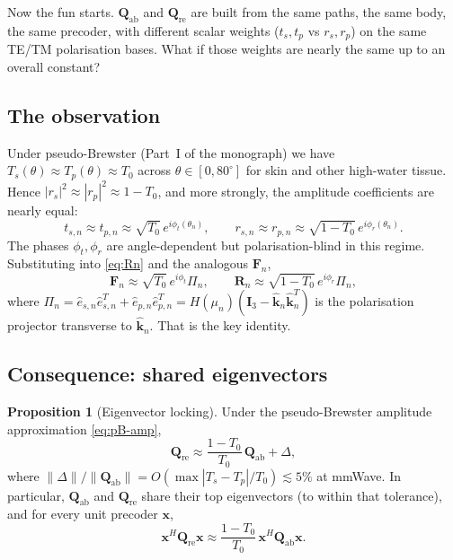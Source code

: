 \documentclass[11pt,a4paper]{article}
\theoremstyle{definition}
\newtheorem{proposition}[proposition]{Proposition}
\newcommand{\khat}{\hat{\bm{k}}}
\newcommand{\Fn}{\mathbf{F}_{\!n}}
\newcommand{\Rn}{\mathbf{R}_{\!n}}
\newcommand{\Qabs}{\mathbf{Q}_{\mathrm{ab}}}
\newcommand{\Qref}{\mathbf{Q}_{\mathrm{re}}}
\begin{document}
Now the fun starts.  $\Qabs$ and $\Qref$ are built from the same
paths, the same body, the same precoder, with different scalar
weights ($t_s,t_p$ vs $r_s,r_p$) on the same TE/TM polarisation
bases.  What if those weights are nearly the same up to an overall
constant?

\subsection{The observation}

Under pseudo-Brewster (Part~I of the monograph) we have
$T_s(\theta)\approx T_p(\theta)\approx T_0$ across
$\theta\in[0,80^\circ]$ for skin and other high-water tissue.  Hence
$|r_s|^2\approx|r_p|^2\approx 1-T_0$, and more strongly, the
amplitude coefficients are nearly equal:
\begin{equation}\label{eq:pB-amp}
  t_{s,n}\approx t_{p,n}\approx\sqrt{T_0}\,e^{i\phi_t(\theta_n)},
  \qquad
  r_{s,n}\approx r_{p,n}\approx\sqrt{1-T_0}\,e^{i\phi_r(\theta_n)}.
\end{equation}
The phases $\phi_t,\phi_r$ are angle-dependent but
polarisation-blind in this regime.  Substituting into \cref{eq:Rn}
and the analogous $\Fn$,
\begin{equation}\label{eq:F-R-collapse}
  \Fn\approx \sqrt{T_0}\,e^{i\phi_t}\Pi_n,\qquad
  \Rn\approx \sqrt{1-T_0}\,e^{i\phi_r}\Pi_n,
\end{equation}
where $\Pi_n=\hat e_{s,n}\hat e_{s,n}^{\!T}+\hat e_{p,n}\hat e_{p,n}^{\!T}
=H(\mu_n)(\mathbf{I}_3-\khat_n\khat_n^{\!T})$ is the polarisation
projector transverse to $\khat_n$.  That is the key identity.

\subsection{Consequence: shared eigenvectors}

\begin{proposition}[Eigenvector locking]\label{prop:lock}
Under the pseudo-Brewster amplitude approximation \cref{eq:pB-amp},
\begin{equation}\label{eq:lock}
  \Qref\approx\frac{1-T_0}{T_0}\,\Qabs + \Delta,
\end{equation}
where $\|\Delta\|/\|\Qabs\|=O(\max|T_s-T_p|/T_0)\lesssim 5\%$ at mmWave.
In particular, $\Qabs$ and $\Qref$ share their top eigenvectors
(to within that tolerance), and for every unit precoder
$\mathbf{x}$,
\begin{equation}\label{eq:lock-ratio}
  \mathbf{x}^H\Qref\mathbf{x}\approx
  \frac{1-T_0}{T_0}\,\mathbf{x}^H\Qabs\mathbf{x}.
\end{equation}
\end{proposition}
\end{document}

